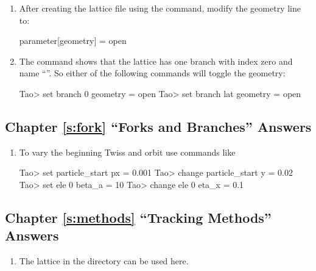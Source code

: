 \documentclass{hitec}     %
\begin{document}
\begin{enumerate}[label=\ref*{s:lat.geom}.\arabic{enumi}]
\item
After creating the lattice file using the  command, modify the geometry line to:
\begin{code}
parameter[geometry] = open
\end{code}
%
\item
The  command shows that the lattice has one branch with index zero and name ``''. So
either of the following commands will toggle the geometry:
\begin{code}
Tao> set branch 0 geometry = open
Tao> set branch lat geometry = open
\end{code}
\end{enumerate}

\subsection[Chapter \ref*{s:fork.ex} ``Forks and Branches'']{Chapter \hyperref[s:fork.ex]{\ref*{s:fork}} ``Forks and Branches'' Answers}
\label{s:ans.fork}

\begin{enumerate}[label=\ref*{s:fork}.\arabic{enumi}]
\item
To vary the beginning Twiss and orbit use commands like
\begin{code}
Tao> set particle_start px = 0.001
Tao> change particle_start y = 0.02
Tao> set ele 0 beta_a = 10
Tao> change ele 0 eta_x = 0.1
\end{code}
\end{enumerate}

\subsection[Chapter \ref*{s:methods.ex} ``Tracking Methods'']{Chapter \hyperref[s:methods.ex]{\ref*{s:methods}} ``Tracking Methods'' Answers}
\label{s:ans.methods}

\begin{enumerate}[label=\ref*{s:methods}.\arabic{enumi}]
\item
The  lattice in the  directory can be used here.
\end{enumerate}

%
\end{document}
